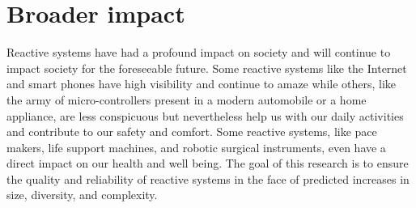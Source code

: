 
\section{Broader impact}

Reactive systems have had a profound impact on society and will continue to impact society for the foreseeable future.
Some reactive systems like the Internet and smart phones have high visibility and continue to amaze while others, like the army of micro-controllers present in a modern automobile or a home appliance, are less conspicuous but nevertheless help us with our daily activities and contribute to our safety and comfort.
Some reactive systems, like pace makers, life support machines, and robotic surgical instruments, even have a direct impact on our health and well being.
The goal of this research is to ensure the quality and reliability of reactive systems in the face of predicted increases in size, diversity, and complexity.



